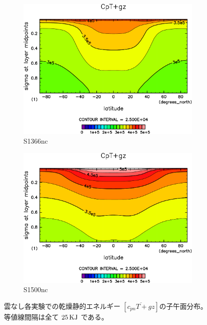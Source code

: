 \documentclass[body]{subfiles}
\begin{document}
\begin{figure}[t]
	\centering
	\begin{subfigure}{.4\textwidth}
		\centering
		\includegraphics[width=\textwidth]{S1366-nc/CpT+gz,time=3650:4015-crop-rotate.pdf}
		\caption{S1366nc}\label{CpT+gzS1366nc}
	\end{subfigure}
	\begin{subfigure}{.4\textwidth}
		\centering
		\includegraphics[width=\textwidth]{S1500-nc/CpT+gz,time=3650:4015-crop-rotate.pdf}
		\caption{S1500nc}\label{CpT+gzS1500nc}
	\end{subfigure}
	\caption[雲なし各実験での乾燥静的エネルギーの子午面分布]{
		雲なし各実験での乾燥静的エネルギー \([\overline{c_{pn}T+gz}]\)の子午面分布。
		等値線間隔は全て \(25\hmu{KJ}\) である。
	}\label{Cp+gznc}
\end{figure}
\end{document}
